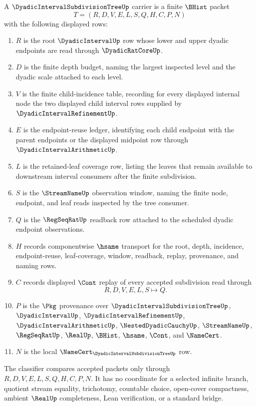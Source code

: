 \begin{definition}
\label{def:dyadic-interval-nested-subdivision-carrier}
A $\DyadicIntervalSubdivisionTreeUp$ carrier is a finite $\BHist$ packet
$$
T=(R,D,V,E,L,S,Q,H,C,P,N)
$$
with the following displayed rows:
\begin{enumerate}
\item $R$ is the root $\DyadicIntervalUp$ row whose lower and upper dyadic endpoints are read through $\DyadicRatCoreUp$.
\item $D$ is the finite depth budget, naming the largest inspected level and the dyadic scale attached to each level.
\item $V$ is the finite child-incidence table, recording for every displayed internal node the two displayed child interval rows supplied by $\DyadicIntervalRefinementUp$.
\item $E$ is the endpoint-reuse ledger, identifying each child endpoint with the parent endpoints or the displayed midpoint row through $\DyadicIntervalArithmeticUp$.
\item $L$ is the retained-leaf coverage row, listing the leaves that remain available to downstream interval consumers after the finite subdivision.
\item $S$ is the $\StreamNameUp$ observation window, naming the finite node, endpoint, and leaf reads inspected by the tree consumer.
\item $Q$ is the $\RegSeqRatUp$ readback row attached to the scheduled dyadic endpoint observations.
\item $H$ records componentwise $\hsame$ transport for the root, depth, incidence, endpoint-reuse, leaf-coverage, window, readback, replay, provenance, and naming rows.
\item $C$ records displayed $\Cont$ replay of every accepted subdivision read through
$$
R,D,V,E,L,S \longmapsto Q .
$$
\item $P$ is the $\Pkg$ provenance over $\DyadicIntervalSubdivisionTreeUp$, $\DyadicIntervalUp$, $\DyadicIntervalRefinementUp$, $\DyadicIntervalArithmeticUp$, $\NestedDyadicCauchyUp$, $\StreamNameUp$, $\RegSeqRatUp$, $\RealUp$, $\BHist$, $\hsame$, $\Cont$, and $\NameCert$.
\item $N$ is the local $\NameCert_{\DyadicIntervalSubdivisionTreeUp}$ row.
\end{enumerate}
The classifier compares accepted packets only through $R,D,V,E,L,S,Q,H,C,P,N$. It has no coordinate for a selected infinite branch, quotient stream equality, trichotomy, countable choice, open-cover compactness, ambient $\RealUp$ completeness, Lean verification, or a standard bridge.
\end{definition}

